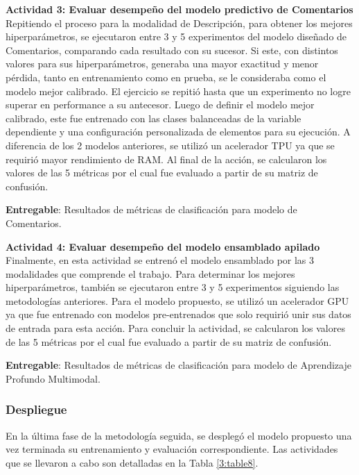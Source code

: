 \textbf{Actividad 3: Evaluar desempeño del modelo predictivo de Comentarios}
\\
Repitiendo el proceso para la modalidad de Descripción, para obtener los mejores hiperparámetros, se ejecutaron entre 3 y 5 experimentos del modelo diseñado de Comentarios, comparando cada resultado con su sucesor. Si este, con distintos valores para sus hiperparámetros, generaba una mayor exactitud y menor pérdida, tanto en entrenamiento como en prueba, se le consideraba como el modelo mejor calibrado. El ejercicio se repitió hasta que un experimento no logre superar en performance a su antecesor. Luego de definir el modelo mejor calibrado, este fue entrenado con las clases balanceadas de la variable dependiente y una configuración personalizada de elementos para su ejecución. A diferencia de los 2 modelos anteriores, se utilizó un acelerador TPU ya que se requirió mayor rendimiento de RAM. Al final de la acción, se calcularon los valores de las 5 métricas por el cual fue evaluado a partir de su matriz de confusión.

\textbf{Entregable}: Resultados de métricas de clasificación para modelo de Comentarios.

\textbf{Actividad 4: Evaluar desempeño del modelo ensamblado apilado}
\\
Finalmente, en esta actividad se entrenó el modelo ensamblado por las 3 modalidades que comprende el trabajo. Para determinar los mejores hiperparámetros, también se ejecutaron entre 3 y 5 experimentos siguiendo las metodologías anteriores. Para el modelo propuesto, se utilizó un acelerador GPU ya que fue entrenado con modelos pre-entrenados que solo requirió unir sus datos de entrada para esta acción. Para concluir la actividad, se calcularon los valores de las 5 métricas por el cual fue evaluado a partir de su matriz de confusión.

\textbf{Entregable}: Resultados de métricas de clasificación para modelo de Aprendizaje Profundo Multimodal.

\subsubsection{Despliegue}
En la última fase de la metodología seguida, se desplegó el modelo propuesto una vez terminada su entrenamiento y evaluación correspondiente. Las actividades que se llevaron a cabo son detalladas en la Tabla \ref{3:table8}.

